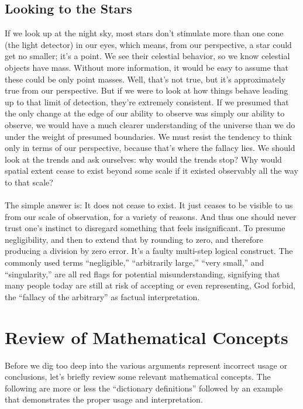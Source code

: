 \documentclass[twoside,twocolumn,9pt]{article}
\begin{document}
\subsection{Looking to the Stars}
If we look up at the night sky, most stars don't stimulate more than one cone (the light detector) in our eyes, which means, from our perspective, a star could get no smaller; it's a point. We see their celestial behavior, so we know celestial objects have mass. Without more information, it would be easy to assume that these could be only point masses. Well, that's not true, but it's approximately true from our perspective. But if we were to look at how things behave leading up to that limit of detection, they're extremely consistent. If we presumed that the only change at the edge of our ability to observe was simply our ability to observe, we would have a much clearer understanding of the universe than we do under the weight of presumed boundaries. We must resist the tendency to think only in terms of our perspective, because that's where the fallacy lies. We should look at the trends and ask ourselves: why would the trends stop? Why would spatial extent cease to exist beyond some scale if it existed observably all the way to that scale?\\
\\
The simple answer is: It does not cease to exist. It just ceases to be visible to us from our scale of observation, for a variety of reasons. And thus one should never trust one's instinct to disregard something that feels insignificant. To presume negligibility, and then to extend that by rounding to zero, and therefore producing a division by zero error. It's a faulty multi-step logical construct. The commonly used terms ``negligible,'' ``arbitrarily large,'' ``very small,'' and ``singularity,'' are all red flags for potential misunderstanding, signifying that many people today are still at risk of accepting or even representing, God forbid, the ``fallacy of the arbitrary'' as factual interpretation.

\section{Review of Mathematical Concepts}
Before we dig too deep into the various arguments represent incorrect usage or conclusions, let's briefly review some relevant mathematical concepts. The following are more or less the ``dictionary definitions'' followed by an example that demonstrates the proper usage and interpretation.
\end{document}
